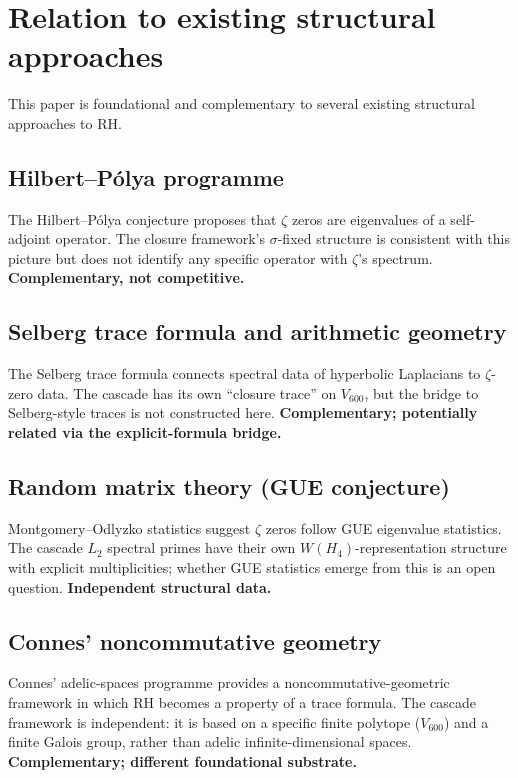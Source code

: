 \documentclass[11pt,a4paper]{article}
\theoremstyle{definition}
\theoremstyle{remark}
\begin{document}
\section{Relation to existing structural approaches}\label{sec:relation}

This paper is foundational and complementary to several existing
structural approaches to RH.

\subsection{Hilbert--P\'olya programme}
The Hilbert--P\'olya conjecture proposes that $\zeta$ zeros are
eigenvalues of a self-adjoint operator. The closure framework's
$\sigma$-fixed structure is consistent with this picture but does not
identify any specific operator with $\zeta$'s spectrum.
\textbf{Complementary, not competitive.}

\subsection{Selberg trace formula and arithmetic geometry}
The Selberg trace formula connects spectral data of hyperbolic Laplacians
to $\zeta$-zero data. The cascade has its own ``closure trace'' on
$V_{600}$, but the bridge to Selberg-style traces is not constructed
here. \textbf{Complementary; potentially related via the explicit-formula bridge.}

\subsection{Random matrix theory (GUE conjecture)}
Montgomery--Odlyzko statistics suggest $\zeta$ zeros follow GUE
eigenvalue statistics. The cascade $L_2$ spectral primes have their own
$W(H_4)$-representation structure with explicit multiplicities; whether
GUE statistics emerge from this is an open question.
\textbf{Independent structural data.}

\subsection{Connes' noncommutative geometry}
Connes' adelic-spaces programme \cite{ConnesAdelic} provides a
noncommutative-geometric framework in which RH becomes a property of a
trace formula. The cascade framework is independent: it is based on a
specific finite polytope ($V_{600}$) and a finite Galois group, rather
than adelic infinite-dimensional spaces. \textbf{Complementary;
different foundational substrate.}
\end{document}
